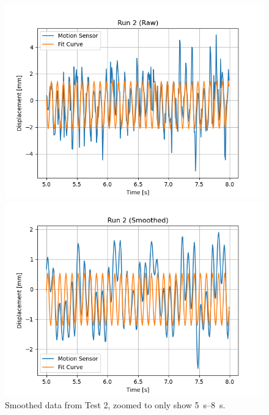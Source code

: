 \documentclass[12 pt]{report}
\begin{document}
\begin{figure}[htbp]
    \centering
    \begin{minipage}{0.45\textwidth}
        \centering
        \includegraphics[width=1.0\textwidth]{images/Graphs/Run_2-Raw-Zoomed} %
        \caption{Raw data from Test 2, zoomed to only show \qtyrange{5}{8}{\s}.}
        \label{fig:run_2-raw-zoomed}
    \end{minipage}\hfill
    \begin{minipage}{0.45\textwidth}
        \centering
        \includegraphics[width=1.0\textwidth]{images/Graphs/Run_2-Smoothed-Zoomed} %
        \caption{Smoothed data from Test 2, zoomed to only show \qtyrange{5}{8}{\s}.}
        \label{fig:run_2-smoothed-zoomed}
    \end{minipage}
\end{figure}
\end{document}
